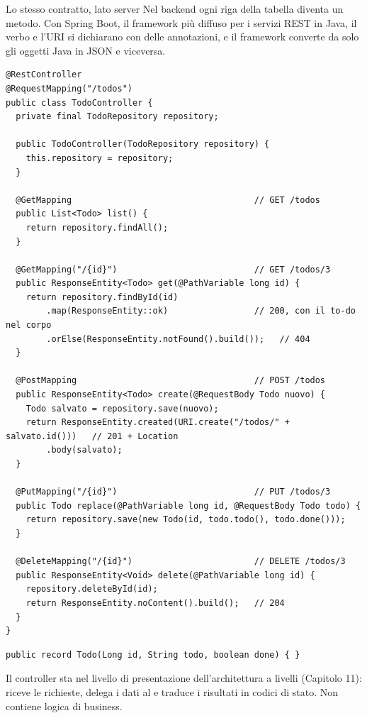 \begin{esempio}{Lo stesso contratto, lato server}
Nel backend ogni riga della tabella diventa un metodo. Con Spring Boot, il framework più diffuso per i servizi REST in
Java, il verbo e l'URI si dichiarano con delle annotazioni, e il framework converte da solo gli oggetti Java in JSON e
viceversa.
\begin{lstlisting}[style=java, name=TodoController.java]
@RestController
@RequestMapping("/todos")
public class TodoController {
  private final TodoRepository repository;

  public TodoController(TodoRepository repository) {
    this.repository = repository;
  }

  @GetMapping                                    // GET /todos
  public List<Todo> list() {
    return repository.findAll();
  }

  @GetMapping("/{id}")                           // GET /todos/3
  public ResponseEntity<Todo> get(@PathVariable long id) {
    return repository.findById(id)
        .map(ResponseEntity::ok)                 // 200, con il to-do nel corpo
        .orElse(ResponseEntity.notFound().build());   // 404
  }

  @PostMapping                                   // POST /todos
  public ResponseEntity<Todo> create(@RequestBody Todo nuovo) {
    Todo salvato = repository.save(nuovo);
    return ResponseEntity.created(URI.create("/todos/" + salvato.id()))   // 201 + Location
        .body(salvato);
  }

  @PutMapping("/{id}")                           // PUT /todos/3
  public Todo replace(@PathVariable long id, @RequestBody Todo todo) {
    return repository.save(new Todo(id, todo.todo(), todo.done()));
  }

  @DeleteMapping("/{id}")                        // DELETE /todos/3
  public ResponseEntity<Void> delete(@PathVariable long id) {
    repository.deleteById(id);
    return ResponseEntity.noContent().build();   // 204
  }
}
\end{lstlisting}
\begin{lstlisting}[style=java, name=Todo.java]
public record Todo(Long id, String todo, boolean done) { }
\end{lstlisting}
Il controller sta nel livello di presentazione dell'architettura a livelli (Capitolo 11): riceve le richieste, delega i
dati al  e traduce i risultati in codici di stato. Non contiene logica di business.
\end{esempio}

